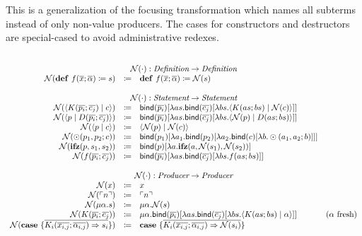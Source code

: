 This is a generalization of the focusing transformation which names all subterms instead of only non-value producers.
The cases for constructors and destructors are special-cased to avoid administrative redexes.

\[
  \begin{array}{rcll}
    \\
    \multicolumn{4}{c}{\name{\cdot} : \emph{Definition} \rightarrow \emph{Definition}}\\
    \name{\defi{f(\overline{x}; \overline{\alpha})}{s}} & \coloneq & \defi{f(\overline{x}; \overline{\alpha})}{\name{s}} & \\
    \\
    \multicolumn{4}{c}{\name{\cdot} : \emph{Statement} \rightarrow \emph{Statement}}\\
    \name{\cut{K(\overline{p_i}; \overline{c_j})}{c}} & \coloneq & \bind{\overline{p_i}}{\lambda as.\bind{\overline{c_j}}{\lambda bs.\cut{K(as; bs)}{\name{c}}}} & \\
    \name{\cut{p}{D(\overline{p_i}; \overline{c_j})}} & \coloneq & \bind{\overline{p_i}}{\lambda as.\bind{\overline{c_j}}{\lambda bs.\cut{\name{p}}{D(as; bs)}}} & \\
    \name{\cut{p}{c}} & \coloneq & \cut{\name{p}}{\name{c}} & \\
    \name{\odot(p_1, p_2; c)}{} & \coloneq & \bind{p_1}{\lambda a_1.\bind{p_2}{\lambda a_2.\bind{c}{\lambda b.\odot(a_1, a_2; b)}}} & \\
    \name{\ifz{p}{s_1}{s_2}}{} & \coloneq & \bind{p}{\lambda a.\ifz{a}{\name{s_1}}{\name{s_2}}} & \\
    \name{f(\overline{p_i}; \overline{c_j})}{} & \coloneq & \bind{\overline{p_i}}{\lambda as.\bind{\overline{c_j}}{\lambda bs.f(as; bs)}} & \\
    \\
    \multicolumn{4}{c}{\name{\cdot} : \emph{Producer} \rightarrow \emph{Producer}}\\
    \name{x} & \coloneq & x & \\
    \name{\lit{n}} & \coloneq & \lit{n} & \\
    \name{\mu\alpha.s} & \coloneq & \mu\alpha.\name{s} & \\
    \name{K(\overline{p_i}; \overline{c_j})} & \coloneq & \mu\alpha.\bind{\overline{p_i}}{\lambda as.\bind{\overline{c_j}}{\lambda bs.\cut{K(as; bs)}{\alpha}}} & \fresh{\alpha} \\
    \name{\case{\overline{K_i(\overline{x_{i,j}}; \overline{\alpha_{i,j}}) \Rightarrow s_i}}} & \coloneq & \case{\overline{K_i(\overline{x_{i,j}}; \overline{\alpha_{i,j}}) \Rightarrow \name{s_i}}} & \\

\end{array}\]
